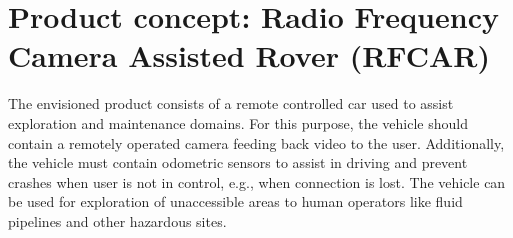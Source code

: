 \section{Product concept: Radio Frequency Camera Assisted Rover (RFCAR)}%
\label{sec:orge7b0dc6}
The envisioned product consists of a remote controlled car used to assist
exploration and maintenance domains. For this purpose, the vehicle should contain a
remotely operated camera feeding back video to the user.
Additionally, the
vehicle must contain odometric sensors to assist in driving and prevent
crashes when user is not in control, e.g., when connection is lost.
The vehicle can be used for exploration of unaccessible areas to human operators
like fluid pipelines and other hazardous sites.

